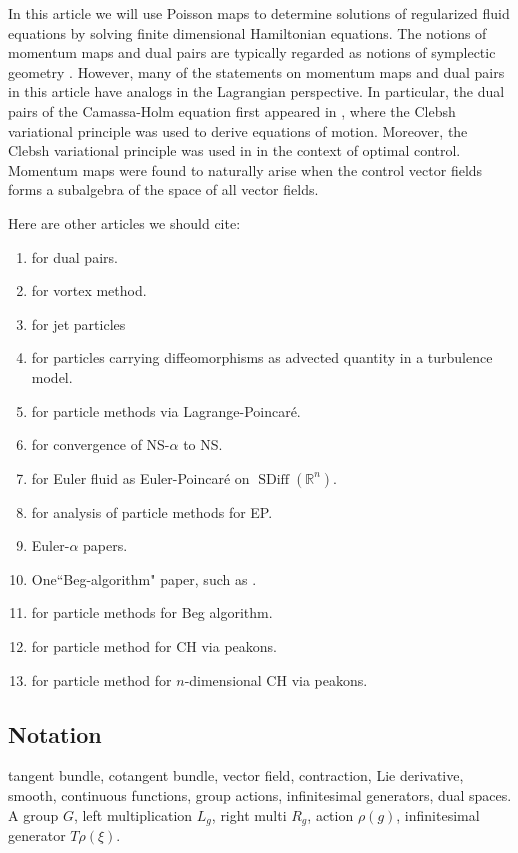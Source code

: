 \documentclass[12pt]{amsart}
\newcommand{\R}{\ensuremath{\mathbb{R}}}
\DeclareMathOperator{\SDiff}{SDiff}
\begin{document}
In this article we will use Poisson maps to determine solutions of regularized
fluid equations by solving finite dimensional Hamiltonian equations.
The notions of momentum maps and dual pairs are typically
regarded as notions of symplectic geometry \cite{FOM,Weinstein1983}.
However, many of the statements on momentum maps and
dual pairs in this article
have analogs in the Lagrangian perspective.
In particular, the dual pairs of the Camassa-Holm equation
first appeared in \cite{HolmMarsden2005}, where the Clebsh
variational principle was used to derive equations of motion.
Moreover, the Clebsh variational principle was used in
\cite{CotterHolm2009} in the context of optimal control.
Momentum maps were found to naturally arise when the
control vector fields forms a subalgebra of the space of all
 vector fields.
 
 Here are other articles we should cite:
 \begin{enumerate}
 	\item \cite{MarsdenWeinstein1983,Weinstein1983} for dual pairs.
 	\item \cite{Chorin1973} for vortex method.
	\item \cite{Sommer2013,CotterHolmJacobsMeier2014} for jet particles
	\item \cite{HolmTronci2012} for particles carrying diffeomorphisms as advected quantity in a turbulence model.
 	\item \cite{JacobsRatiuDesbrun2013} for particle methods via Lagrange-Poincar\'e.
	\item \cite{FoiasHolmTiti2001} for convergence of NS-$\alpha$ to NS.
	\item \cite{Arnold1966} for Euler fluid as Euler-Poincar\'e on $\SDiff(\R^n)$.
	\item \cite{TrouveYounes2005} for analysis of particle methods for EP.
	\item Euler-$\alpha$ papers.
	\item One``Beg-algorithm" paper, such as \cite{Beg2005}.
	\item \cite{JoshiMiller2000} for particle methods for Beg algorithm.
	\item \cite{HoldenRaynaud2006} for particle method for CH via peakons.
	\item \cite{ChertockDuToitMarsden2012} for particle method for $n$-dimensional CH via peakons.
 \end{enumerate}

\subsection{Notation}
tangent bundle, cotangent bundle, vector field, contraction, Lie derivative,
smooth, continuous functions, group actions, infinitesimal generators,
dual spaces.  A group $G$, left multiplication $L_g$, right multi $R_g$, 
action $\rho(g)$, infinitesimal generator $T\rho(\xi)$.
\end{document}
